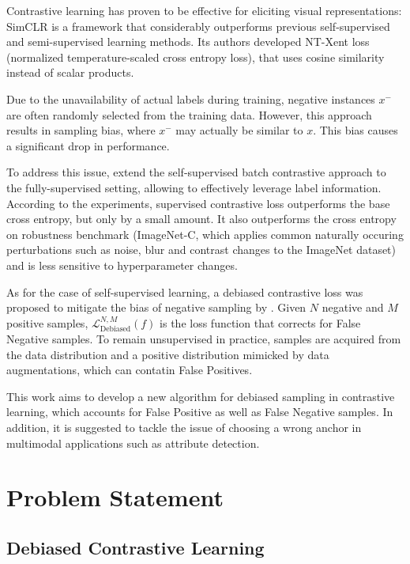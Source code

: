 \documentclass{article}
\begin{document}
Contrastive learning has proven to be effective for eliciting visual representations: SimCLR  \citep{Chen2020SimCLR} is a framework that considerably outperforms previous self-supervised and semi-supervised learning methods. Its authors developed NT-Xent loss (normalized temperature-scaled cross entropy loss), that uses cosine similarity instead of scalar products.

Due to the unavailability of actual labels during training, negative instances $x^-$ are often randomly selected from the training data. However, this approach results in sampling bias, where $x^-$ may actually be similar to $x$. This bias causes a significant drop in performance. 

To address this issue, \citep{khosla2021supervised} extend the self-supervised batch contrastive approach to the fully-supervised setting, allowing to effectively leverage label information. According to the experiments, supervised contrastive loss outperforms the base cross entropy, but only by a small amount. It also outperforms the cross entropy on robustness benchmark (ImageNet-C, which applies common naturally occuring perturbations such as noise, blur and contrast changes to the ImageNet dataset) and is less sensitive to hyperparameter changes.

As for the case of self-supervised learning, a debiased contrastive loss was proposed to mitigate the bias of negative sampling by \citep{chuang2021debiased}. Given $N$ negative and $M$ positive samples, $\mathcal{L}^{N, M}_{\text{Debiased}} (f)$ is the loss function that corrects for False Negative samples. To remain unsupervised in practice, samples are acquired from the data distribution and a positive distribution mimicked by data augmentations, which can contatin False Positives.

This work aims to develop a new algorithm for debiased sampling in contrastive learning, which accounts for False Positive as well as False Negative samples. In addition, it is suggested to tackle the issue of choosing a wrong anchor in multimodal applications such as attribute detection.



\section{Problem Statement}
\label{sec:headings}

\subsection{Debiased Contrastive Learning}
\end{document}
